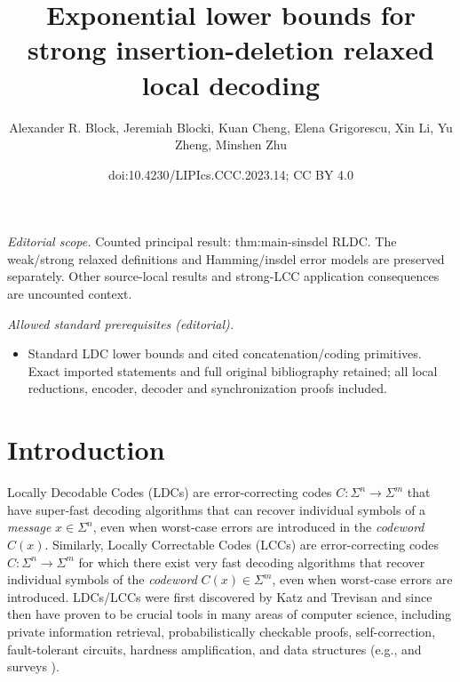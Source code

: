 \documentclass[10pt,a4paper]{article}
\title{Exponential lower bounds for strong insertion-deletion relaxed local decoding}
\author{Alexander R. Block, Jeremiah Blocki, Kuan Cheng, Elena Grigorescu, Xin Li, Yu Zheng, Minshen Zhu}
\date{doi:10.4230/LIPIcs.CCC.2023.14; CC BY 4.0}
\theoremstyle{remark}
\begin{document}
\maketitle
\noindent\textit{Editorial scope.} Counted principal result: thm:main-sinsdel RLDC. The weak/strong relaxed definitions and Hamming/insdel error models are preserved separately. Other source-local results and strong-LCC application consequences are uncounted context.\par\medskip
\noindent\textit{Allowed standard prerequisites (editorial).}\begin{itemize}
\item Standard LDC lower bounds and cited concatenation/coding primitives. Exact imported statements and full original bibliography retained; all local reductions, encoder, decoder and synchronization proofs included.
\end{itemize}\medskip
\section{Introduction}\label{sec:intro}

Locally Decodable Codes (LDCs) \cite{KatzT00, SudanTV99} are error-correcting codes $C: \Sigma^n \rightarrow \Sigma^m$ that have super-fast decoding algorithms that can recover individual symbols of a {\em message} $x\in \Sigma^n$, even when worst-case errors are introduced in the {\em codeword} $C(x)$. Similarly, Locally Correctable Codes (LCCs) are error-correcting codes $C: \Sigma^n \rightarrow \Sigma^m$ for which there exist very fast decoding algorithms that recover individual symbols of the {\em codeword} $C(x)\in \Sigma^m$, even when worst-case errors are introduced. LDCs/LCCs were first discovered by Katz and Trevisan \cite{KatzT00} and since then 
have proven to be crucial tools in many areas of computer science, including private information retrieval, probabilistically checkable proofs, self-correction,  fault-tolerant circuits,  hardness amplification, and data structures (e.g., \cite{BabaiFLS91,LundFKN92,BlumLR93,BlumK95,ChorKGS98,ChenGW13,AndoniLRW17} and surveys \cite{Tre04-survey,Gasarch04}).
\end{document}
